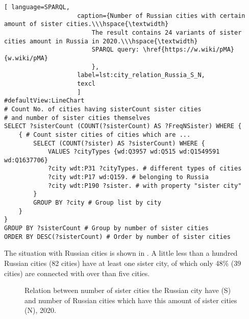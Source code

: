 \begin{lstlisting}[ language=SPARQL, 
                    caption={Number of Russian cities with certain amount of sister cities.\\\hspace{\textwidth}
                        The result contains 24 variants of sister cities amount in Russia in 2020.\\\hspace{\textwidth}
                        SPARQL query: \href{https://w.wiki/pMA}{w.wiki/pMA}
                        },
                    label=lst:city_relation_Russia_S_N,
                    texcl 
                    ]
#defaultView:LineChart                                                   
# Count No. of cities having sisterCount sister cities  
# and number of sister cities themselves
SELECT ?sisterCount (COUNT(?sisterCount) AS ?FreqNSister) WHERE {                                                                                  
	{ # Count sister cities of cities which are ...
		SELECT (COUNT(?sister) AS ?sisterCount) WHERE {    
			VALUES ?cityTypes {wd:Q3957 wd:Q515 wd:Q1549591 wd:Q1637706}
			?city wdt:P31 ?cityTypes. # different types of cities
			?city wdt:P17 wd:Q159. # belonging to Russia
			?city wdt:P190 ?sister. # with property "sister city"
		}
		GROUP BY ?city # Group list by city                             
	}
}
GROUP BY ?sisterCount # Group by number of sister cities
ORDER BY DESC(?sisterCount) # Order by number of sister cities
\end{lstlisting}%


The situation with Russian cities is shown in . A little less than a hundred Russian cities (82 cities) have at least one sister city, of which only 48\% (39 cities) are connected with over than five cities.

\begin{figure}[H]
{
\setlength{\fboxsep}{0pt}%
\setlength{\fboxrule}{1pt}%
%
}
  \caption{Relation between number of sister cities the Russian city have (S) and number of Russian cities which have this amount of sister cities (N), 2020.}%
\end{figure}

